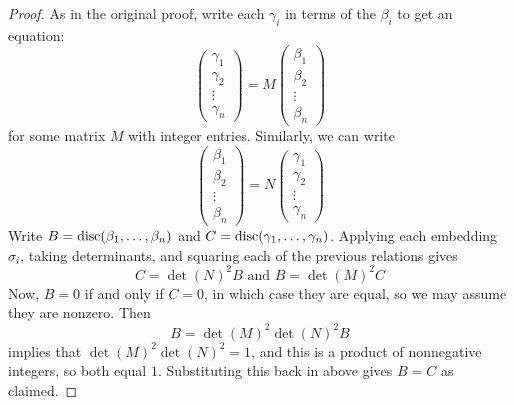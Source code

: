 \begin{proof}
	As in the original proof, write each $\gamma_i$ in terms of the $\beta_i$ to get an equation:
	\[ \left(\begin{array}{c} \gamma_1 \\ \gamma_2 \\ \vdots \\ \gamma_n \end{array}\right) = M\left(\begin{array}{c} \beta_1 \\ \beta_2 \\ \vdots \\ \beta_n \end{array}\right) \]
	for some matrix $M$ with integer entries. Similarly, we can write
	\[ \left(\begin{array}{c} \beta_1 \\ \beta_2 \\ \vdots \\ \beta_n \end{array}\right) = N\left(\begin{array}{c} \gamma_1 \\ \gamma_2 \\ \vdots \\ \gamma_n \end{array}\right) \]
	Write $B = \operatorname{disc}(\beta_1,\ldots,\beta_n)$ and $C = \operatorname{disc}(\gamma_1,\ldots,\gamma_n)$. Applying each embedding $\sigma_i$, taking determinants, and squaring each of the previous relations gives
	\[ C = \det(N)^2B \text{ and } B = \det(M)^2C \]
	Now, $B = 0$ if and only if $C = 0$, in which case they are equal, so we may assume they are nonzero. Then
	\[ B = \det(M)^2\det(N)^2B \]
	implies that $\det(M)^2\det(N)^2 = 1$, and this is a product of nonnegative integers, so both equal $1$. Substituting this back in above gives $B = C$ as claimed.
\end{proof}
